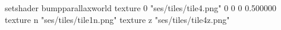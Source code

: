 setshader bumpparallaxworld
texture 0 "ses/tiles/tile4.png" 0 0 0 0.500000
texture n "ses/tiles/tile1n.png"
texture z "ses/tiles/tile4z.png"

